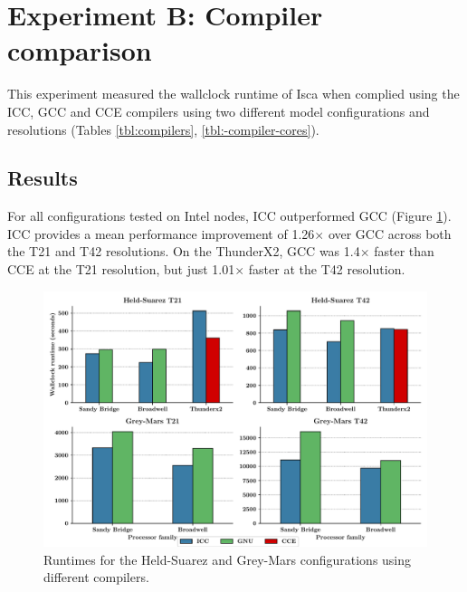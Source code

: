 \documentclass[a4paper,11pt]{report}
\begin{document}
%
%
%
%



\section{Experiment B: Compiler comparison}
This experiment measured the wallclock runtime of Isca when complied using the ICC, GCC and CCE compilers using two different model configurations and resolutions (Tables \ref{tbl:compilers},  \ref{tbl:-compiler-cores}). 
\subsection{Results}
For all configurations tested on Intel nodes, ICC outperformed GCC (Figure \ref{fig:compiler-comparison-t42}). ICC provides a mean performance improvement of 1.26$\times$ over GCC across both the T21 and T42 resolutions. On the ThunderX2, GCC was 1.4$\times$ faster than CCE at the T21 resolution, but just 1.01$\times$ faster at the T42 resolution.


\par
\begin{figure}[htbp]
\begin{center}
\includegraphics[width=1\textwidth]{img/compiler-comparison.pdf}
\caption[Performance comparison using different compilers]{Runtimes for the Held-Suarez and Grey-Mars configurations using different compilers.}
\label{fig:compiler-comparison-t42}
\end{center}
\end{figure}
\end{document}
